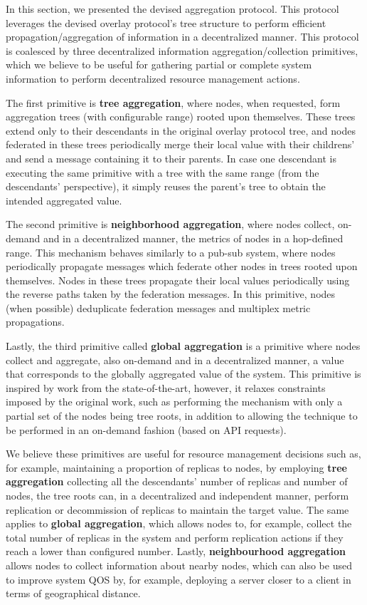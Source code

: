 In this section, we presented the devised aggregation protocol. This protocol leverages the devised overlay protocol's tree structure to perform efficient propagation/aggregation of information in a decentralized manner. This protocol is coalesced by three decentralized information aggregation/collection primitives, which we believe to be useful for gathering partial or complete system information to perform decentralized resource management actions. 

The first primitive is \textbf{tree aggregation}, where nodes, when requested, form aggregation trees (with configurable range) rooted upon themselves. These trees extend only to their descendants in the original overlay protocol tree, and nodes federated in these trees periodically merge their local value with their childrens' and send a message containing it to their parents. In case one descendant is executing the same primitive with a tree with the same range (from the descendants' perspective), it simply reuses the parent's tree to obtain the intended aggregated value. 

The second primitive is \textbf{neighborhood aggregation}, where nodes collect, on-demand and in a decentralized manner, the metrics of nodes in a hop-defined range. This mechanism behaves similarly to a pub-sub system, where nodes periodically propagate messages which federate other nodes in trees rooted upon themselves. Nodes in these trees propagate their local values periodically using the reverse paths taken by the federation messages. In this primitive, nodes (when possible) deduplicate federation messages and multiplex metric propagations.

Lastly, the third primitive called \textbf{global aggregation} is a primitive where nodes collect and aggregate, also on-demand and in a decentralized manner, a value that corresponds to the globally aggregated value of the system. This primitive is inspired by work from the state-of-the-art, however, it relaxes constraints imposed by the original work, such as performing the mechanism with only a partial set of the nodes being tree roots, in addition to allowing the technique to be performed in an on-demand fashion (based on API requests).

We believe these primitives are useful for resource management decisions such as, for example, maintaining a proportion of replicas to nodes, by employing \textbf{tree aggregation} collecting all the descendants' number of replicas and number of nodes, the tree roots can, in a decentralized and independent manner, perform replication or decommission of replicas to maintain the target value. The same applies to \textbf{global aggregation}, which allows nodes to, for example, collect the total number of replicas in the system and perform replication actions if they reach a lower than configured number. Lastly, \textbf{neighbourhood aggregation} allows nodes to collect information about nearby nodes, which can also be used to improve system QOS by, for example, deploying a server closer to a client in terms of geographical distance.

